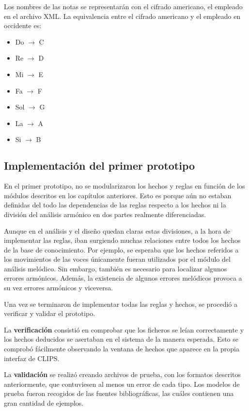 Los nombres de las notas se representarán con el cifrado americano, el empleado en el archivo XML. La equivalencia entre el cifrado americano y el empleado en occidente es:

\begin{itemize}

	\item Do $\rightarrow$ C
	\item Re $\rightarrow$ D
	\item Mi $\rightarrow$ E
	\item Fa $\rightarrow$ F
	\item Sol $\rightarrow$ G
	\item La $\rightarrow$ A
	\item Si $\rightarrow$ B

\end{itemize}

\subsection{Implementación del primer prototipo}

En el primer prototipo, no se modularizaron los hechos y reglas en función de los módulos descritos en los capítulos anteriores. Esto es porque aún no estaban definidas del todo las dependencias de las reglas respecto a los hechos ni la división del análisis armónico en dos partes realmente diferenciadas. 

Aunque en el análisis y el diseño quedan claras estas divisiones, a la hora de implementar las reglas, iban surgiendo muchas relaciones entre todos los hechos de la base de conocimiento. Por ejemplo, se esperaba que los hechos referidos a los movimientos de las voces únicamente fueran utilizados por el módulo del análisis melódico. Sin embargo, también es necesario para localizar algunos errores armónicos. Además, la existencia de algunos errores melódicos provoca a su vez errores armónicos y viceversa. 

Una vez se terminaron de implementar todas las reglas y hechos, se procedió a verificar y validar el prototipo. 

La  \textbf{verificación} consistió en comprobar que los ficheros se leían correctamente y los hechos deducidos se asertaban en el sistema de la manera esperada. Esto se comprobó fácilmente observando la ventana de hechos que aparece en la propia interfaz de CLIPS.

La \textbf{validación} se realizó creando archivos de prueba, con los formatos descritos anteriormente, que contuviesen al menos un error de cada tipo. Los modelos de prueba fueron recogidos de las fuentes bibliográficas, las cuáles contienen una gran cantidad de ejemplos.

